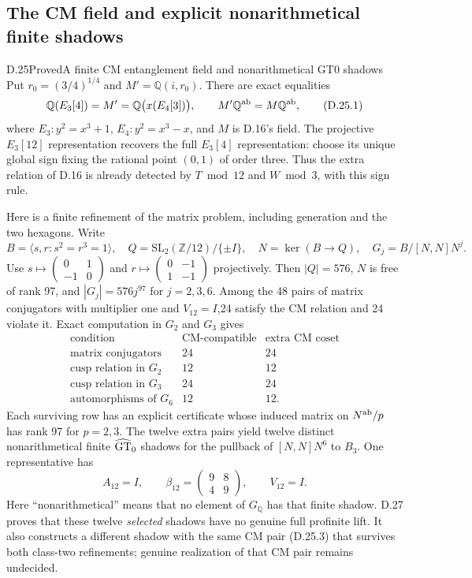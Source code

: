 \subsection{The CM field and explicit nonarithmetical finite shadows}

\begin{statement}{D.25}{Proved}{A finite CM entanglement field and nonarithmetical GT0 shadows}
Put $r_0=(3/4)^{1/4}$ and $M'=\mathbb Q(i,r_0)$. There are exact equalities
\[
 \mathbb Q(E_3[4])=M'=\mathbb Q\bigl(x(E_4[3])\bigr),\qquad
 M'\mathbb Q^{\rm ab}=M\mathbb Q^{\rm ab},                  \tag{D.25.1}
\]
where $E_3:y^2=x^3+1$, $E_4:y^2=x^3-x$, and $M$ is D.16's field.
The projective $E_3[12]$ representation recovers the full $E_3[4]$
representation: choose its unique global sign fixing the rational
point $(0,1)$ of order three. Thus the extra relation of D.16 is
already detected by $T\bmod12$ and $W\bmod3$, with this sign rule.

Here is a finite refinement of the matrix problem, including
generation and the two hexagons. Write
\[
 B=\langle s,r:s^2=r^3=1\rangle,\quad
 Q=\mathrm{SL}_2(\mathbb Z/12)/\{\pm I\},\quad
 N=\ker(B\to Q),\quad G_j=B/[N,N]N^j.
\]
Use $s\mapsto\left(\begin{smallmatrix}0&1\\-1&0\end{smallmatrix}\right)$
and $r\mapsto\left(\begin{smallmatrix}0&-1\\1&-1\end{smallmatrix}\right)$
projectively. Then $|Q|=576$, $N$ is free of rank 97, and
$|G_j|=576j^{97}$ for $j=2,3,6$.
Among the 48 pairs of matrix conjugators with multiplier one and
$V_{12}=I$,24 satisfy the CM relation and 24 violate it.
Exact computation in $G_2$ and $G_3$ gives
\[
\begin{array}{c|rr}
\text{condition}&\text{CM-compatible}&\text{extra CM coset}\\\hline
\text{matrix conjugators}&24&24\\
\text{cusp relation in }G_2&12&12\\
\text{cusp relation in }G_3&24&24\\
\text{automorphisms of }G_6&12&12.
\end{array}                                               \tag{D.25.2}
\]
Each surviving row has an explicit certificate whose induced
matrix on $N^{\rm ab}/p$ has rank 97 for $p=2,3$.
The twelve extra pairs yield twelve distinct nonarithmetical
finite $\widehat{\rm GT}_0$ shadows for the pullback of
$[N,N]N^6$ to $B_3$. One representative has
\[
 A_{12}=I,\qquad
 \beta_{12}=\begin{pmatrix}9&8\\4&9\end{pmatrix},\qquad
 V_{12}=I.                                                \tag{D.25.3}
\]
Here ``nonarithmetical'' means that no element of $G_{\mathbb Q}$
has that finite shadow. D.27 proves that these twelve
\emph{selected} shadows have no genuine full profinite lift.
It also constructs a different shadow with the same CM
pair (D.25.3) that survives both class-two refinements;
genuine realization of that CM pair remains undecided.
\end{statement}
